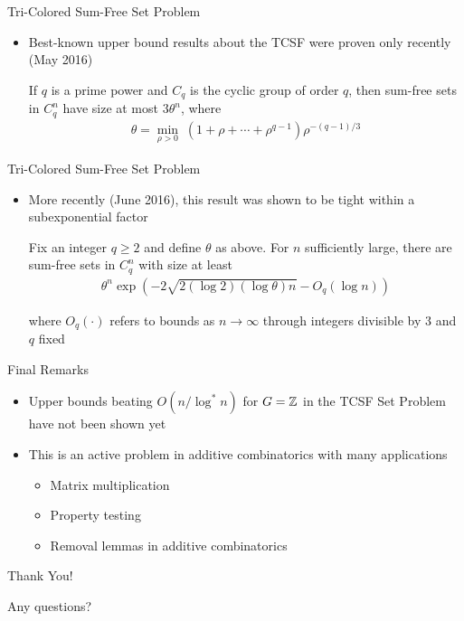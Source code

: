 \begin{frame}{Tri-Colored Sum-Free Set Problem}
\begin{itemize}
	\item Best-known upper bound results about the TCSF were proven only recently (May 2016)
	{
	\begin{theorem}
		If $q$ is a prime power and $C_q$ is the cyclic group of order $q$, then sum-free sets in $C_q^n$ have size at most $3\theta^n$, where
		\begin{align*}
			\theta = \underset{\rho > 0}{\min}\; (1 + \rho + \cdots + \rho^{q-1})\rho^{-(q-1)/3}
		\end{align*}
	\end{theorem}}
\end{itemize}
\end{frame}

\begin{frame}{Tri-Colored Sum-Free Set Problem}
\begin{itemize}
	\item More recently (June 2016), this result was shown to be tight within a subexponential factor
	{
	\begin{theorem}
		Fix an integer $q \geq 2$ and define $\theta$ as above. For $n$ sufficiently large, there are sum-free sets in $C_q^n$ with size at least
		\begin{align*}
		\theta^n \exp\left( -2 \sqrt{2(\log 2)(\log \theta)n} - O_q(\log n) \right)
		\end{align*}
	\end{theorem}}
	where $O_q(\cdot)$ refers to bounds as $n \rightarrow \infty$ through integers divisible by $3$ and $q$ fixed
\end{itemize}
\end{frame}

\begin{frame}{Final Remarks}
\begin{itemize}
	\item<1-> Upper bounds beating $O(n / \log^* n)$ for $G = {\mathbb Z}$ in the TCSF Set Problem have not been shown yet
	\item<2-> This is an active problem in additive combinatorics with many applications
	\begin{itemize}
		\item<3-> Matrix multiplication \cite{KSS16}
		\item<3-> Property testing \cite{BX15}
		\item<3-> Removal lemmas in additive combinatorics \cite{Green05}
	\end{itemize}
\end{itemize}
\end{frame}

\begin{frame}{Thank You!}
\centering

Any questions?
\end{frame}




